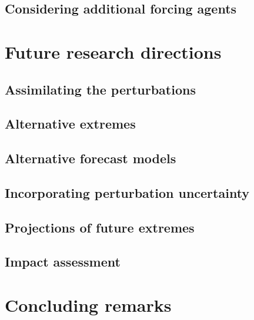   \subsection*{Considering additional forcing agents}

  

\section{Future research directions}

  \subsection*{Assimilating the perturbations}

    \blindtext

  \subsection*{Alternative extremes}

    \blindtext

  \subsection*{Alternative forecast models}

    \blindtext

  \subsection*{Incorporating perturbation uncertainty}

    \blindtext

  \subsection*{Projections of future extremes}

    \blindtext

  \subsection*{Impact assessment}

    \blindtext

\section{Concluding remarks}
